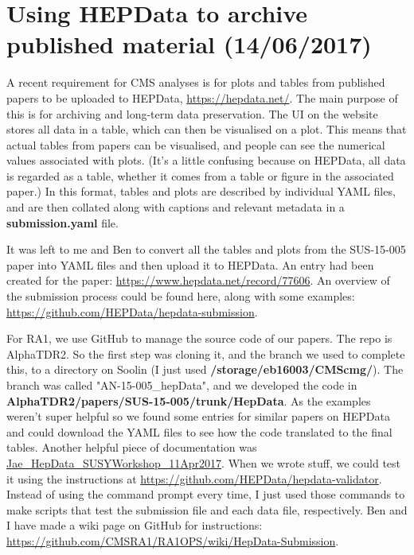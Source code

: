 
\chapter{Using HEPData to archive published material (14/06/2017)}

A recent requirement for CMS analyses is for plots and tables from published papers to be uploaded to HEPData, \url{https://hepdata.net/}. The main purpose of this is for archiving and long-term data preservation. The UI on the website stores all data in a table, which can then be visualised on a plot. This means that actual tables from papers can be visualised, and people can see the numerical values associated with plots. (It's a little confusing because on HEPData, all data is regarded as a table, whether it comes from a table or figure in the associated paper.) In this format, tables and plots are described by individual YAML files, and are then collated along with captions and relevant metadata in a \textbf{submission.yaml} file.

It was left to me and Ben to convert all the tables and plots from the SUS-15-005 paper into YAML files and then upload it to HEPData. An entry had been created for the paper: \url{https://www.hepdata.net/record/77606}. An overview of the submission process could be found here, along with some examples: \url{https://github.com/HEPData/hepdata-submission}.

For RA1, we use GitHub to manage the source code of our papers. The repo is AlphaTDR2. So the first step was cloning it, and the branch we used to complete this, to a directory on Soolin (I just used \textbf{/storage/eb16003/CMScmg/}). The branch was called "AN-15-005\_hepData", and we developed the code in \textbf{AlphaTDR2/papers/SUS-15-005/trunk/HepData}. As the examples weren't super helpful so we found some entries for similar papers on HEPData and could download the YAML files to see how the code translated to the final tables. Another helpful piece of documentation was \href{run:modules/Sec 26 - Using HEPData to archive published materiallistings/Jae_HepData_SUSYWorkshop_11Apr2017.pdf}{Jae\_HepData\_SUSYWorkshop\_11Apr2017}. When we wrote stuff, we could test it using the instructions at \url{https://github.com/HEPData/hepdata-validator}. Instead of using the command prompt every time, I just used those commands to make scripts that test the submission file and each data file, respectively. Ben and I have made a wiki page on GitHub for instructions: \url{https://github.com/CMSRA1/RA1OPS/wiki/HepData-Submission}.

